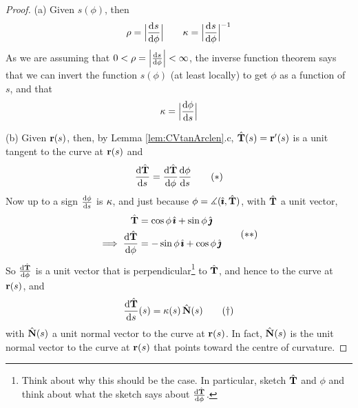 \begin{proof}
(a) 
Given $s(\phi)$, then
\begin{equation*}
\rho = \Big|\diff{s}{\phi}\Big|\qquad
\ka = \Big|\diff{s}{\phi}\Big|^{-1}
\end{equation*}
As we are assuming that $0<\rho=\Big|\diff{s}{\phi}\Big|<\infty$, 
the inverse function theorem says that we can 
invert the function $s(\phi)$ (at least locally) to get $\phi$ as a 
function of $s$, and that
\begin{equation*}
\ka = \Big|\diff{\phi}{s}\Big|
\end{equation*}

\bigskip
\noindent (b)
Given $\mathbf{r}(s)$,
then, by Lemma \ref{lem:CVtanArclen}.c, $\hat{\mathbf{T}}(s) = \mathbf{r}'(s)$ 
is a unit tangent to the curve at $\mathbf{r}(s)$ and
\begin{equation}
\diff{\hat\vT}{s} = \diff{\hat\vT}{\phi} \diff{\phi}{s}
\tag{$*$}
\end{equation}
Now up to a sign $\diff{\phi}{s}$ is $\kappa$, and just because 
$\phi=\measuredangle(\hat{\pmb{\imath}},\hat{\mathbf{T}})$, with $\hat{\mathbf{T}}$ a unit vector,
\begin{equation}
\begin{split}
\hat\vT&=\cos\phi\,\hi + \sin\phi\,\hj \\
\implies \diff{\hat\vT}{\phi}&= -\sin\phi\,\hi + \cos\phi\,\hj
\end{split} 
\tag{$**$}
\end{equation}
So $\diff{\hat\vT}{\phi}$ is a unit vector that is 
perpendicular\footnote{Think about why this should be the case. In particular,
sketch $\hat{\mathbf{T}}$ and $\phi$ and think about what the sketch says about 
$\diff{\hat\vT}{\phi}$.} to $\hat{\mathbf{T}}$, and hence to the curve at $\mathbf{r}(s)$, and
\begin{equation}
\diff{\hat\vT}{s}(s) = \ka(s)\,\hat\vN(s)
\tag{$\dagger$}
\end{equation}
with $\hat{\mathbf{N}}(s)$ a unit normal vector to the curve at $\mathbf{r}(s)$.
In fact, $\hat{\mathbf{N}}(s)$ is the unit normal vector to the curve at $\mathbf{r}(s)$
that points toward the centre of curvature.


\end{proof}
